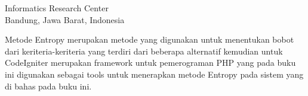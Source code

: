 

{Informatics Research Center\\
Bandung, Jawa Barat, Indonesia}

Metode Entropy merupakan metode yang digunakan untuk menentukan bobot dari keriteria-keriteria yang terdiri dari beberapa alternatif kemudian untuk CodeIgniter merupakan framework untuk pemerograman PHP yang pada buku ini digunakan sebagai tools untuk menerapkan metode Entropy pada sistem yang di bahas pada buku ini.

